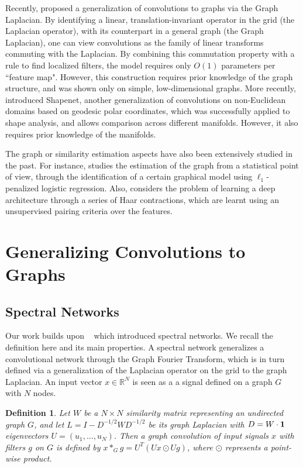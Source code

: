 \documentclass{article} %
\newtheorem{graphconv}{Definition}
\begin{document}
Recently, \cite{spectralnet2013} proposed a generalization of convolutions to graphs via the Graph Laplacian. By identifying a linear, translation-invariant operator in the grid (the Laplacian operator), with its counterpart in a general graph (the Graph Laplacian), one can view convolutions as the family of linear transforms commuting with the Laplacian. By combining this commutation property with a rule to find localized filters, the model requires only $O(1)$ parameters per ``feature map". However, this construction requires prior knowledge of the graph structure, and was shown only on simple, low-dimensional graphs. More recently, \cite{DBLP:journals/corr/MasciBBV15} introduced Shapenet, another generalization of convolutions on non-Euclidean domains based on geodesic polar coordinates, which was successfully applied to shape analysis, and allows comparison across different manifolds. However, it also requires prior knowledge of the manifolds. 

The graph or similarity estimation aspects have also been extensively studied in the past. For instance, \cite{ravikumar2010high} studies the estimation of the graph from a statistical point of view, through the identification of a certain graphical model using $\ell_1$-penalized logistic regression. Also, \cite{chen2014unsupervised} considers the problem of learning a deep architecture through a series of Haar contractions, which are learnt using an unsupervised pairing criteria over the features.

\section{Generalizing Convolutions to Graphs }
\label{spectralsect}
\subsection{Spectral Networks}

Our work builds upon ~\cite{spectralnet2013} which introduced spectral networks. We recall the definition here and its main properties.
A spectral network generalizes a convolutional network through the Graph Fourier Transform, which is in turn defined via a generalization of the Laplacian operator on the grid to the graph Laplacian. An input vector $x \in \mathbb{R}^N$ is seen as a a signal defined on a graph $G$ with $N$ nodes. 
\begin{graphconv}
 Let $W$ be a $N \times N$ similarity matrix representing an undirected graph $G$, and let $L = I - D^{-1/2}WD^{-1/2}$ be its graph Laplacian with $D=W\cdot {\bf 1}$ eigenvectors $U=(u_1,\dots,u_N)$. Then a \textit{graph convolution} of input signals $x$ with filters $g$ on $G$ is defined by $x \ast_G g = U^T \left( Ux \odot Ug \right)$, where $\odot$ represents a point-wise product. 
\end{graphconv}
\end{document}
